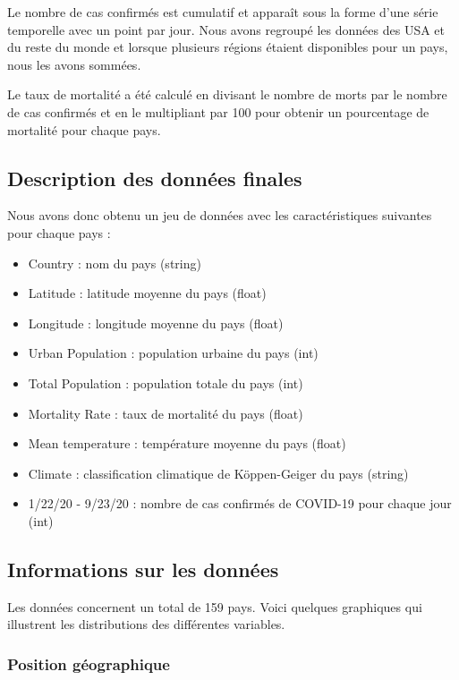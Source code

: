 \documentclass[12pt]{iEEEtran}
\begin{document}
Le nombre de cas confirmés est cumulatif et apparaît sous la forme d'une série temporelle
avec un point par jour. Nous avons regroupé les données des USA et du reste du monde et
lorsque plusieurs régions étaient disponibles pour un pays, nous les avons sommées.

Le taux de mortalité a été calculé en divisant le nombre de morts par le nombre de cas confirmés
et en le multipliant par 100 pour obtenir un pourcentage de mortalité pour chaque pays.

\subsection{Description des données finales}
Nous avons donc obtenu un jeu de données avec les caractéristiques suivantes pour chaque pays :
\begin{itemize}
    \item Country : nom du pays (string)
    \item Latitude : latitude moyenne du pays (float)
    \item Longitude : longitude moyenne du pays (float)
    \item Urban Population : population urbaine du pays (int)
    \item Total Population : population totale du pays (int)
    \item Mortality Rate : taux de mortalité du pays (float)
    \item Mean temperature : température moyenne du pays (float)
    \item Climate : classification climatique de Köppen-Geiger du pays (string)
    \item 1/22/20 - 9/23/20 : nombre de cas confirmés de COVID-19 pour chaque jour (int)
\end{itemize}

\subsection{Informations sur les données}

Les données concernent un total de 159 pays. Voici quelques graphiques qui illustrent
les distributions des différentes variables.
\\

\subsubsection{Position géographique}\hfill\\
\end{document}

